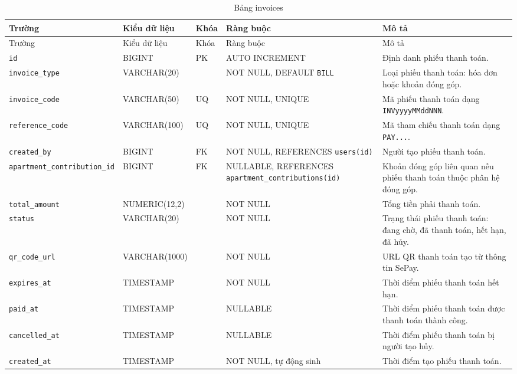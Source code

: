 ﻿\documentclass[12pt,a4paper]{report}
\begin{document}
\begin{longtable}{L{4.2cm} L{2.15cm} L{0.75cm} L{3.05cm} L{4.0cm}}
\caption{Bảng invoices}\label{tab:db-invoices}\\
\toprule
Trường & Kiểu dữ liệu & Khóa & Ràng buộc & Mô tả \\
\midrule
\endfirsthead
\toprule Trường & Kiểu dữ liệu & Khóa & Ràng buộc & Mô tả \\\midrule
\endhead
\texttt{id} & BIGINT & PK & AUTO INCREMENT & Định danh phiếu thanh toán. \\
\texttt{invoice\_type} & VARCHAR(20) & & NOT NULL, DEFAULT \texttt{BILL} & Loại phiếu thanh toán: hóa đơn hoặc khoản đóng góp. \\
\texttt{invoice\_code} & VARCHAR(50) & UQ & NOT NULL, UNIQUE & Mã phiếu thanh toán dạng \texttt{INVyyyyMMddNNN}. \\
\texttt{reference\_code} & VARCHAR(100) & UQ & NOT NULL, UNIQUE & Mã tham chiếu thanh toán dạng \texttt{PAY...}. \\
\texttt{created\_by} & BIGINT & FK & NOT NULL, REFERENCES \texttt{users(id)} & Người tạo phiếu thanh toán. \\
\texttt{apartment\_contribution\_id} & BIGINT & FK & NULLABLE, REFERENCES \texttt{apartment\_}\newline\texttt{contributions(id)} & Khoản đóng góp liên quan nếu phiếu thanh toán thuộc phân hệ đóng góp. \\
\texttt{total\_amount} & NUMERIC(12,2) & & NOT NULL & Tổng tiền phải thanh toán. \\
\texttt{status} & VARCHAR(20) & & NOT NULL & Trạng thái phiếu thanh toán: đang chờ, đã thanh toán, hết hạn, đã hủy. \\
\texttt{qr\_code\_url} & VARCHAR(1000) & & NOT NULL & URL QR thanh toán tạo từ thông tin SePay. \\
\texttt{expires\_at} & TIMESTAMP & & NOT NULL & Thời điểm phiếu thanh toán hết hạn. \\
\texttt{paid\_at} & TIMESTAMP & & NULLABLE & Thời điểm phiếu thanh toán được thanh toán thành công. \\
\texttt{cancelled\_at} & TIMESTAMP & & NULLABLE & Thời điểm phiếu thanh toán bị người tạo hủy. \\
\texttt{created\_at} & TIMESTAMP & & NOT NULL, tự động sinh & Thời điểm tạo phiếu thanh toán. \\
\bottomrule
\end{longtable}
\end{document}
